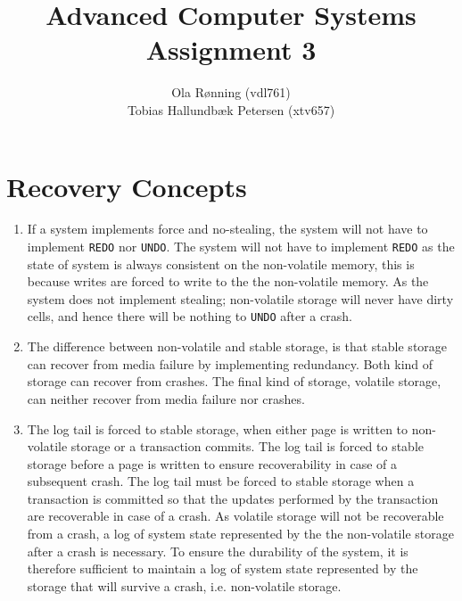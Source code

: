 \documentclass[a4paper]{article}
\author{Ola Rønning (vdl761) \\ Tobias Hallundbæk Petersen (xtv657)}
\title{Advanced Computer Systems \\ Assignment 3}
\begin{document}
\maketitle
\section{Recovery Concepts}
\begin{enumerate}
\item If a system implements force and no-stealing, the system will not have to implement \texttt{REDO} nor \texttt{UNDO}. The system will not have to implement \texttt{REDO} as the state of system is always consistent on the non-volatile memory, this is because writes are forced to write to the the non-volatile memory. As the system does not implement stealing; non-volatile storage will never have dirty cells, and hence there will be nothing to \texttt{UNDO} after a crash.
\item The difference between non-volatile and stable storage, is that stable storage can recover from media failure by implementing redundancy. Both kind of storage can recover from crashes. The final kind of storage, volatile storage, can neither recover from media failure nor crashes.
\item The log tail is forced to stable storage, when either page is written to non-volatile storage or a transaction commits. The log tail is forced to stable storage before a page is written to ensure recoverability in case of a subsequent crash. The log tail must be forced to stable storage when a transaction is committed so that the updates performed by the transaction are recoverable in case of a crash. As volatile storage will not be recoverable from a crash, a log of system state represented by the the non-volatile storage after a crash is necessary. To ensure the durability of the system, it is therefore sufficient to maintain a log of system state represented by the storage that will survive a crash, i.e. non-volatile storage.
\end{enumerate}
\end{document}
